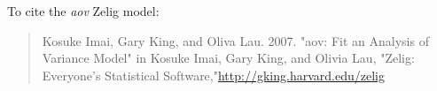 To cite the \emph{ aov } Zelig model:
 \begin{verse}
 Kosuke Imai, Gary King, and Oliva Lau. 2007. "aov: Fit an Analysis of Variance Model" in Kosuke Imai, Gary King, and Olivia Lau, "Zelig: Everyone's Statistical Software,"\url{http://gking.harvard.edu/zelig} 
\end{verse}